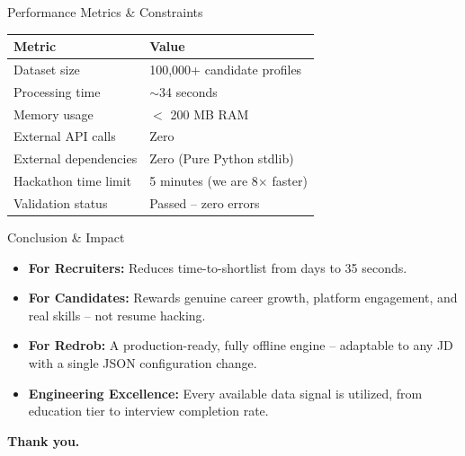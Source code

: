 \documentclass[aspectratio=169]{beamer}
\begin{document}
\begin{frame}{Performance Metrics \& Constraints}
  \begin{table}
    \centering
    \begin{tabular}{@{}ll@{}}
      \toprule
      \textbf{Metric} & \textbf{Value} \\
      \midrule
      Dataset size          & 100,000+ candidate profiles \\
      Processing time       & $\sim$34 seconds \\
      Memory usage          & $<$ 200 MB RAM \\
      External API calls    & Zero \\
      External dependencies & Zero (Pure Python stdlib) \\
      Hackathon time limit  & 5 minutes (we are 8$\times$ faster) \\
      Validation status     & Passed -- zero errors \\
      \bottomrule
    \end{tabular}
  \end{table}
\end{frame}


\begin{frame}{Conclusion \& Impact}
  \begin{itemize}
    \item \textbf{For Recruiters:} Reduces time-to-shortlist from days to 35 seconds.
    \item \textbf{For Candidates:} Rewards genuine career growth, platform engagement, and real skills -- not resume hacking.
    \item \textbf{For Redrob:} A production-ready, fully offline engine -- adaptable to any JD with a single JSON configuration change.
    \item \textbf{Engineering Excellence:} Every available data signal is utilized, from education tier to interview completion rate.
  \end{itemize}
  \vspace{2em}
  \begin{center}
    \textbf{Thank you.}
  \end{center}
\end{frame}
\end{document}
